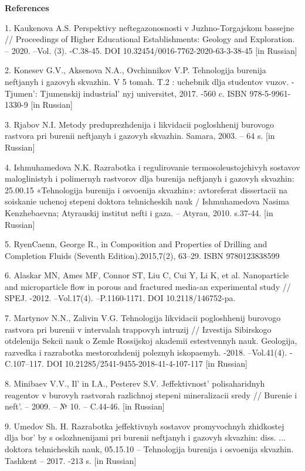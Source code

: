 \begin{center}
{\bfseries References}
\end{center}

\begin{references}
1. Kaukenova A.S. Perspektivy neftegazonosnosti v Juzhno-Torgajskom
bassejne // Proceedings of Higher Educational Establishments: Geology
and Exploration. -- 2020. --Vol. (3). -C.38-45. DOI
10.32454/0016-7762-2020-63-3-38-45 {[}in Russian{]}

2. Konesev G.V., Aksenova N.A., Ovchinnikov V.P. Tehnologija burenija
neftjanyh i gazovyh skvazhin. V 5 tomah. T.2 : uchebnik dlja studentov
vuzov. -Tjumen': Tjumenskij
industrial' nyj universitet, 2017. -560 c. ISBN
978-5-9961-1330-9 {[}in Russian{]}

3. Rjabov N.I. Metody preduprezhdenija i likvidacii pogloshhenij
burovogo rastvora pri burenii neftjanyh i gazovyh skvazhin. Samara,
2003. -- 64 s. {[}in Russian{]}

4. Ishmuhamedova N.K. Razrabotka i regulirovanie termosoleustojchivyh
sostavov maloglinistyh i polimernyh rastvorov dlja burenija neftjanyh i
gazovyh skvazhin: 25.00.15 «Tehnologija burenija i osvoenija skvazhin»:
avtoreferat dissertacii na soiskanie uchenoj stepeni doktora
tehnicheskih nauk / Ishmuhamedova Nasima Kenzhebaevna; Atyrauskij
institut nefti i gaza. -- Atyrau, 2010. s.37-44. {[}in Russian{]}

5. RyenCaenn, George R., in Composition and Properties of Drilling and
Completion Fluids (Seventh Edition).2015,7(2), 63--29. ISBN
9780123838599

6. Alaskar MN, Ames MF, Connor ST, Liu C, Cui Y, Li K, et al.
Nanoparticle and microparticle flow in porous and fractured media-an
experimental study // SPEJ. -2012. --Vol.17(4). --P.1160-1171. DOI
10.2118/146752-pa.

7. Martynov N.N., Zalivin V.G. Tehnologija likvidacii pogloshhenij
burovogo rastvora pri burenii v intervalah trappovyh intruzij //
Izvestija Sibirskogo otdelenija Sekcii nauk o Zemle Rossijskoj akademii
estestvennyh nauk. Geologija, razvedka i razrabotka mestorozhdenij
poleznyh iskopaemyh. -2018. --Vol.41(4). -C.107--117. DOI
10.21285/2541-9455-2018-41-4-107-117 {[}in Russian{]}

8. Minibaev V.V., Il' in I.A., Pesterev S.V.
Jeffektivnost'{} polisaharidnyh reagentov v burovyh
rastvorah razlichnoj stepeni mineralizacii sredy // Burenie i
neft'. -- 2009. -- № 10. -- C.44-46. {[}in Russian{]}

9. Umedov Sh. H. Razrabotka jeffektivnyh sostavov promyvochnyh
zhidkostej dlja bor' by s oslozhnenijami pri burenii
neftjanyh i gazovyh skvazhin: diss. ... doktora tehnicheskih nauk,
05.15.10 -- Tehnologija burenija i osvoenija skvazhin. Tashkent -- 2017.
-213 s. {[}in Russian{]}


\end{references}
